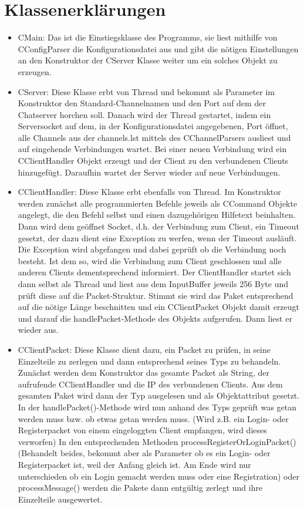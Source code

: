 \documentclass[a4paper,12pt]{scrartcl}
\begin{document}
\section{Klassenerklärungen}
\begin{itemize}
\item CMain: Das ist die Einstiegsklasse des Programms, sie liest mithilfe von CConfigParser die Konfigurationsdatei aus und gibt die nötigen Einstellungen an den Konstruktor der CServer Klasse weiter um ein solches Objekt zu erzeugen.
\item CServer: Diese Klasse erbt von Thread und bekommt als Parameter im Konstruktor den Standard-Channelnamen und den Port auf dem der Chatserver horchen soll. Danach wird der Thread gestartet, indem ein Serversocket auf dem, in der Konfigurationsdatei angegebenen, Port öffnet, alle Channels aus der channels.lst mittels des CChannelParsers ausliest und auf eingehende Verbindungen wartet. Bei einer neuen Verbindung wird ein CClientHandler Objekt erzeugt und der Client zu den verbundenen Clients hinzugefügt. Daraufhin wartet der Server wieder auf neue Verbindungen.
\item CClientHandler: Diese Klasse erbt ebenfalls von Thread. Im Konstruktor werden zunächst alle programmierten Befehle jeweils als CCommand Objekte angelegt, die den Befehl selbst und einen dazugehörigen Hilfetext beinhalten. Dann wird dem geöffnet Socket, d.h. der Verbindung zum Client, ein Timeout gesetzt, der dazu dient eine Exception zu werfen, wenn der Timeout ausläuft. Die Exception wird abgefangen und dabei geprüft ob die Verbindung noch besteht. Ist dem so, wird die Verbindung zum Client geschlossen und alle anderen Clients dementsprechend informiert. Der ClientHandler startet sich dann selbst als Thread und liest aus dem InputBuffer jeweils 256 Byte und prüft diese auf die Packet-Struktur. Stimmt sie wird das Paket entsprechend auf die nötige Länge beschnitten und ein CClientPacket Objekt damit erzeugt und darauf die handlePacket-Methode des Objekts aufgerufen. Dann liest er wieder aus.
\item CClientPacket: Diese Klasse dient dazu, ein Packet zu prüfen, in seine Einzelteile zu zerlegen und dann entsprechend seines Typs zu behandeln. Zunächst werden dem Konstruktor das gesamte Packet als String, der aufrufende CClientHandler und die IP des verbundenen Clients. Aus dem gesamten Paket wird dann der Typ ausgelesen und als Objektattribut gesetzt. In der handlePacket()-Methode wird nun anhand des Typs geprüft was getan werden muss bzw. ob etwas getan werden muss. (Wird z.B. ein Login- oder Registerpacket von einem eingeloggten Client empfangen, wird dieses verworfen) In den entsprechenden Methoden processRegisterOrLoginPacket() (Behandelt beides, bekommt aber als Parameter ob es ein Login- oder Registerpacket ist, weil der Anfang gleich ist. Am Ende wird nur unterschieden ob ein Login gemacht werden muss oder eine Registration) oder processMessage() werden die Pakete dann entgültig zerlegt und ihre Einzelteile ausgewertet.

\end{itemize}
\end{document}
